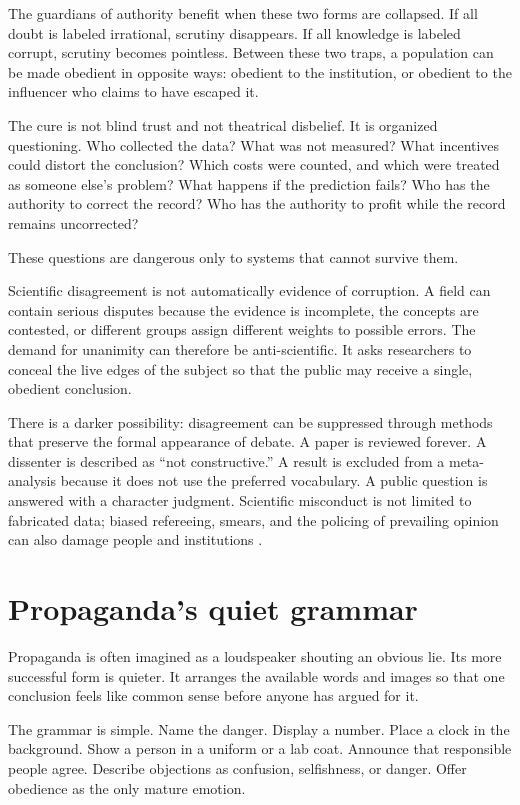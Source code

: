 ﻿\documentclass[12pt,a4paper]{book}
\begin{document}
The guardians of authority benefit when these two forms are collapsed. If all
doubt is labeled irrational, scrutiny disappears. If all knowledge is labeled
corrupt, scrutiny becomes pointless. Between these two traps, a population
can be made obedient in opposite ways: obedient to the institution, or
obedient to the influencer who claims to have escaped it.

The cure is not blind trust and not theatrical disbelief. It is organized
questioning. Who collected the data? What was not measured? What incentives
could distort the conclusion? Which costs were counted, and which were
treated as someone else's problem? What happens if the prediction fails? Who
has the authority to correct the record? Who has the authority to profit while
the record remains uncorrected?

These questions are dangerous only to systems that cannot survive them.

Scientific disagreement is not automatically evidence of corruption. A field
can contain serious disputes because the evidence is incomplete, the concepts
are contested, or different groups assign different weights to possible errors.
The demand for unanimity can therefore be anti-scientific. It asks researchers
to conceal the live edges of the subject so that the public may receive a
single, obedient conclusion.

There is a darker possibility: disagreement can be suppressed through methods
that preserve the formal appearance of debate. A paper is reviewed forever.
A dissenter is described as ``not constructive.'' A result is excluded from a
meta-analysis because it does not use the preferred vocabulary. A public
question is answered with a character judgment. Scientific misconduct is not
limited to fabricated data; biased refereeing, smears, and the policing of
prevailing opinion can also damage people and institutions
\cite{Cabbolet-2013}.

\section{Propaganda's quiet grammar}

Propaganda is often imagined as a loudspeaker shouting an obvious lie. Its
more successful form is quieter. It arranges the available words and images
so that one conclusion feels like common sense before anyone has argued for
it.

The grammar is simple. Name the danger. Display a number. Place a clock in the
background. Show a person in a uniform or a lab coat. Announce that responsible
people agree. Describe objections as confusion, selfishness, or danger. Offer
obedience as the only mature emotion.
\end{document}
